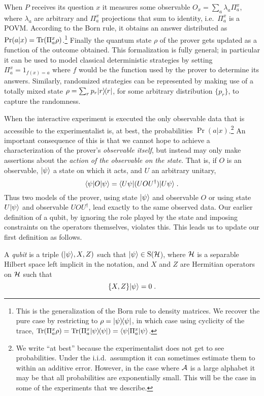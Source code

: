 When $P$ receives its question $x$ it measures some observable $O_x = \sum_a \lambda_a \Pi^x_a$, where $\lambda_a$ are arbitrary and $\Pi^x_a$ projections that sum to identity, i.e.\ $\Pi^x_a$ is a POVM. According to the Born rule, it obtains an answer distributed as $\Pr(a|x) = \mbox{\rm Tr}(\Pi^x_a \rho)$.\footnote{This is the generalization of the Born rule to density matrices. We recover the pure case by restricting to $\rho = |\psi\rangle\!\langle\psi|$, in which case using cyclicity of the trace, $\mbox{\rm Tr}(\Pi^x_a \rho) = \mbox{\rm Tr}(\Pi^x_a |\psi\rangle\!\langle\psi|) = \langle\psi| \Pi^x_a |\psi\rangle$.}
 Finally the quantum state $\rho$ of the prover gets updated as a function of the outcome obtained. This formalization is fully general; in particular it can be used to model classical deterministic strategies by setting $\Pi^x_a = 1_{f(x)=a}$ where $f$ would be the function used by the prover to determine its answers. Similarly, randomized strategies can be represented by making use  of a totally mixed state $\rho = \sum_r p_r |r\rangle\!\langle r|$, for some arbitrary distribution $\{p_r\}$, to capture the randomness. 

When the interactive experiment is executed the only observable data that is accessible to the experimentalist is, at best, the probabilities $\Pr(a|x)$.\footnote{We write ``at best'' because the experimentalist does not get to see probabilities. Under the i.i.d.\ assumption it can sometimes estimate them to within an additive error. However, in the case where $\mathcal{A}$ is a large alphabet it may be that all probabilities are exponentially small. This will be the case in some of the experiments that we describe.}
An important consequence of this is that we cannot hope to achieve a characterization of the prover's \emph{observable itself}, but instead may only make assertions about  the \emph{action of the observable on the state}. That is, if $O$ is an observable, $|\psi\rangle$ a state on which it acts, and $U$ an arbitrary unitary,
\[ \langle\psi| O |\psi\rangle =\langle U\psi|  (UOU^\dagger) |U\psi\rangle\;.\]
Thus two models of the prover, using state $|\psi\rangle$ and observable $O$ or using state $U |\psi\rangle$ and observable $UOU^\dagger$, lead exactly to the same observed data. Our earlier definition of a qubit, by ignoring the role played by the state and imposing constraints on the operators themselves, violates this. This leads us to update our first definition as follows. 

\begin{definition}\label{def:qubit-2}
A \emph{qubit} is a triple $(|\psi\rangle,X,Z)$ such that $|\psi\rangle \in \mathrm{S}(\mathcal{H}$), where $\mathcal{H}$ is a separable Hilbert space left implicit in the notation, and $X$ and $Z$ are Hermitian operators on $\mathcal{H}$ such that
\begin{equation}\label{eq:ac-state}
\{X,Z\}|\psi\rangle = 0\;.
\end{equation}
\end{definition}

